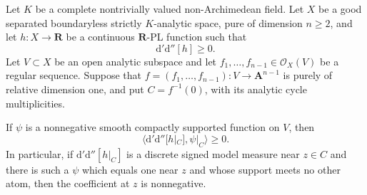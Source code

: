 \begin{proposition}
\label{prop:p01-lci-atom-slice-candidate}
Let $K$ be a complete nontrivially valued non-Archimedean field.  Let $X$ be
a good separated boundaryless strictly $K$-analytic space, pure of dimension
$n\geq2$, and let $h:X\to\mathbf R$ be a continuous $\mathbf R$-PL
function such that
\[
                         \mathrm d'\mathrm d''[h]\geq0.
\]
Let $V\subset X$ be an open analytic subspace and let
$f_1,\ldots,f_{n-1}\in\mathcal O_X(V)$ be a regular sequence.  Suppose that
$f=(f_1,\ldots,f_{n-1}):V\to\mathbf A^{n-1}$ is purely of relative
dimension one, and put $C=f^{-1}(0)$, with its analytic cycle
multiplicities.

If $\psi$ is a nonnegative smooth compactly supported function on $V$, then
\[
 \bigl\langle\mathrm d'\mathrm d''[h|_C],\psi|_C\bigr\rangle\geq0.
\]
In particular, if $\mathrm d'\mathrm d''[h|_C]$ is a discrete signed model
measure near $z\in C$ and there is such a $\psi$ which equals one near $z$
and whose support meets no other atom, then the coefficient at $z$ is
nonnegative.
\end{proposition}

